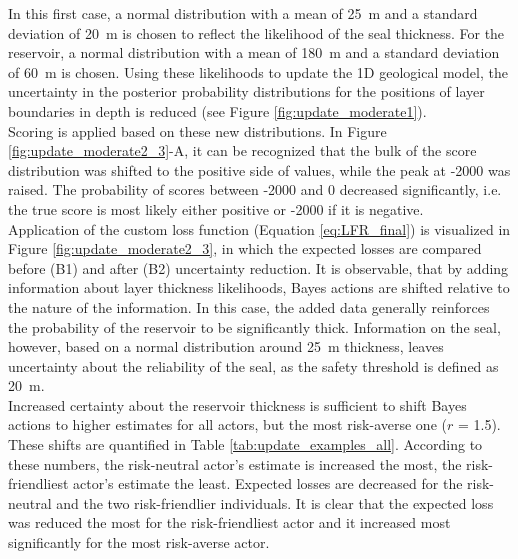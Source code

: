 				In this first case, a normal distribution with a mean of 25~m and a standard deviation of 20~m is chosen to reflect the likelihood of the seal thickness. For the reservoir, a normal distribution with a mean of 180~m and a standard deviation of 60~m is chosen. Using these likelihoods to update the 1D geological model, the uncertainty in the posterior probability distributions for the positions of layer boundaries in depth is reduced (see Figure \ref{fig:update_moderate1}).\\					
				Scoring is applied based on these new distributions. In Figure \ref{fig:update_moderate2_3}-A, it can be recognized that the bulk of the score distribution was shifted to the positive side of values, while the peak at -2000 was raised. The probability of scores between -2000 and 0 decreased significantly, i.e. the true score is most likely either positive or -2000 if it is negative.\\
				Application of the custom loss function (Equation \ref{eq:LFR_final}) is visualized in Figure \ref{fig:update_moderate2_3}, in which the expected losses are compared before (B1) and after (B2) uncertainty reduction. It is observable, that by adding information about layer thickness likelihoods, Bayes actions are shifted relative to the nature of the information. In this case, the added data generally reinforces the probability of the reservoir to be significantly thick. Information on the seal, however, based on a normal distribution around 25~m thickness, leaves uncertainty about the reliability of the seal, as the safety threshold is defined as 20~m.\\				
				Increased certainty about the reservoir thickness is sufficient to shift Bayes actions to higher estimates for all actors, but the most risk-averse one ($r$ = 1.5). These shifts are quantified in Table \ref{tab:update_examples_all}. According to these numbers, the risk-neutral actor's estimate is increased the most, the risk-friendliest actor's estimate the least. Expected losses are decreased for the risk-neutral and the two risk-friendlier individuals. It is clear that the expected loss was reduced the most for the risk-friendliest actor and it increased most significantly for the most risk-averse actor.\\				
								
